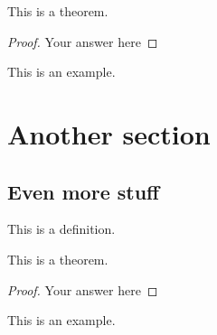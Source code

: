 \documentclass[boxes,sansserif]{seastaralgebras_expository}
\begin{document}
\begin{thm}
    This is a theorem.
\end{thm}
\begin{proof}
Your answer here
\end{proof}

\begin{example}
    This is an example.
\end{example}

\section{Another section}

\subsection{Even more stuff}

\begin{defn}
This is a definition.
\end{defn}

\begin{thm}
    This is a theorem.
\end{thm}
\begin{proof}
Your answer here
\end{proof}

\begin{example}
    This is an example.
\end{example}
\end{document}
